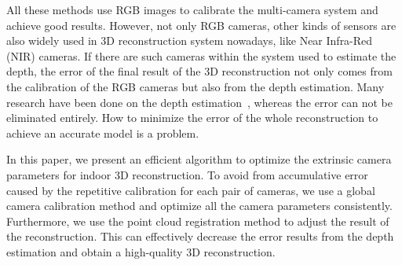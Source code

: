 All these methods use RGB images to calibrate the multi-camera system and achieve good results. However, not only RGB cameras, other kinds of sensors are also widely used in 3D reconstruction system nowadays, like Near Infra-Red (NIR) cameras. If there are such cameras within the system used to estimate the depth, the error of the final result of the 3D reconstruction not only comes from the calibration of the RGB cameras but also from the depth estimation. Many research have been done on the depth estimation~\cite{scharstein,Bleyer2011PatchMatch}, whereas the error can not be eliminated entirely. How to minimize the error of the whole reconstruction to achieve an accurate model is a problem.

In this paper, we present an efficient algorithm to optimize the extrinsic camera parameters for indoor 3D reconstruction. To avoid from accumulative error caused by the repetitive calibration for each pair of cameras, we use a global camera calibration method and optimize all the camera parameters consistently. Furthermore, we use the point cloud registration method to adjust the result of the reconstruction. This can effectively decrease the error results from the depth estimation and obtain a high-quality 3D reconstruction.

 